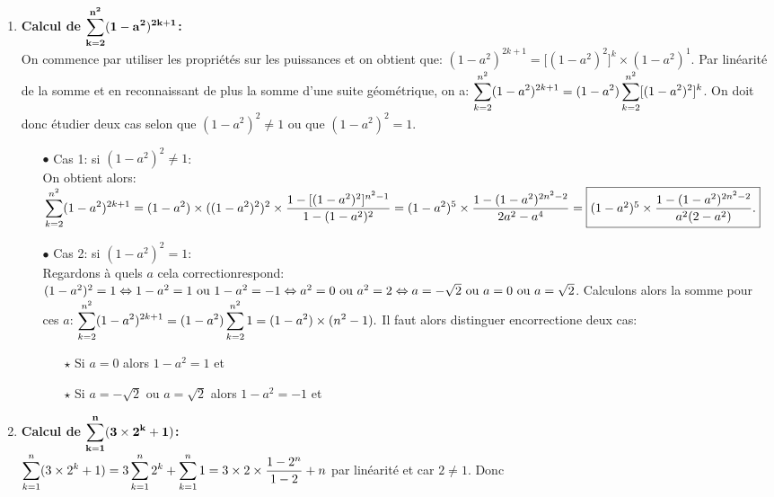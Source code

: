 \documentclass[a4paper, 11pt,reqno]{article}
\begin{document}
\begin{correction}
\begin{enumerate}
Une autre solution consiste à faire la somme des paires entre $1$ et $2n$ puis simplifier l'expression avec la somme de tous les entiers au cube. 
\item  \textbf{Calcul de $\mathbf{\displaystyle \sum\limits_{k=2}^{n^2} (1-a^2)^{2k+1}}$:}\\
\noindent On commence par utiliser les propri\'et\'es sur les puissances et on obtient que: $(1-a^2)^{2k+1}=\lbrack(1-a^2)^2\rbrack^k \times (1-a^2)^1$. Par lin\'earit\'e de la somme et en reconnaissant de plus la somme d'une suite g\'eom\'etrique, on a: $\displaystyle \sum\limits_{k=2}^{n^2} (1-a^2)^{2k+1}=(1-a^2)\displaystyle \sum\limits_{k=2}^{n^2} \lbrack (1-a^2)^2 \rbrack^k$. On doit donc \'etudier deux cas selon que $(1-a^2)^2\not= 1$ ou que $(1-a^2)^2= 1$.
\begin{itemize}
\item[$\bullet$] Cas 1: si $(1-a^2)^2\not= 1$:\\
\noindent On obtient alors: $\displaystyle \sum\limits_{k=2}^{n^2} (1-a^2)^{2k+1}=(1-a^2)\times ((1-a^2)^2)^2\times \displaystyle\frac{1-\lbrack (1-a^2)^2\rbrack^{n^2-1}}{1-(1-a^2)^2}=(1-a^2)^5\times \displaystyle\frac{1- (1-a^2)^{2n^2-2}}{2a^2-a^4}=\fbox{$(1-a^2)^5\times \displaystyle\frac{1- (1-a^2)^{2n^2-2}}{a^2(2-a^2)}$.}$
\item[$\bullet$] Cas 2: si $(1-a^2)^2= 1$:\\
\noindent Regardons \`{a} quels $a$ cela correctionrespond: $(1-a^2)^2= 1\Leftrightarrow 1-a^2=1\ \hbox{ou}\ 1-a^2=-1\Leftrightarrow a^2=0\ \hbox{ou}\ a^2=2\Leftrightarrow a=-\sqrt{2}\ \hbox{ou}\ a=0\ \hbox{ou}\ a=\sqrt{2}$. Calculons alors la somme pour ces $a$: $\displaystyle \sum\limits_{k=2}^{n^2} (1-a^2)^{2k+1}=(1-a^2)\displaystyle \sum\limits_{k=2}^{n^2} 1=(1-a^2)\times (n^2-1).$ Il faut alors distinguer encorrectione deux cas: 
\begin{itemize}
\item[$\star$] Si $a=0$ alors $1-a^2=1$ et 
\item[$\star$] Si $a=-\sqrt{2}$ ou $a=\sqrt{2}$ alors $1-a^2=-1$ et 
\end{itemize}
\end{itemize}
\item  \textbf{Calcul de $\mathbf{\displaystyle \sum\limits_{k=1}^n (3\times 2^k+1) }$:}\\
\noindent $\displaystyle \sum\limits_{k=1}^n (3\times 2^k+1)=3 \displaystyle \sum\limits_{k=1}^n 2^k+\displaystyle \sum\limits_{k=1}^n 1=3\times 2\times \displaystyle\frac{1-2^n}{1-2} +n $ par lin\'earit\'e et car $2\not=1$. Donc 
\begin{center}
\end{center}


\end{enumerate}
\end{correction}
\end{document}
